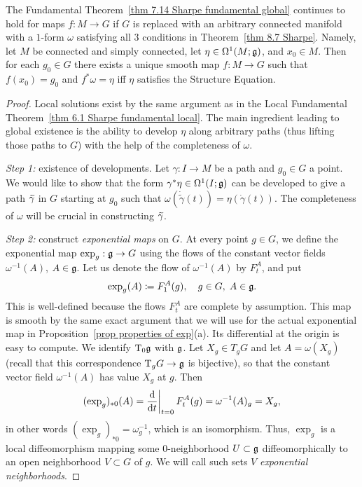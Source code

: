 \begin{thm}\label{prop generalization of fundamental thm}
    The Fundamental Theorem~\ref{thm 7.14 Sharpe fundamental global} continues to hold for maps $f:M\to G$ if $G$ is replaced with an arbitrary connected manifold with a $1$-form $\omega$ satisfying all $3$ conditions in Theorem~\ref{thm 8.7 Sharpe}. Namely, let $M$ be connected and simply connected, let $\eta\in\Omega^1(M;\mathfrak{g})$, and $x_0\in M$. Then for each $g_0\in G$ there exists a unique smooth map $f:M\to G$ such that $f(x_0)=g_0$ and $f^\ast\omega=\eta$ iff $\eta$ satisfies the Structure Equation.
\end{thm}
\begin{proof}
    Local solutions exist by the same argument as in the Local Fundamental Theorem~\ref{thm 6.1 Sharpe fundamental local}. The main ingredient leading to global existence is the ability to develop $\eta$ along arbitrary paths (thus lifting those paths to $G$) with the help of the completeness of $\omega$.

    \emph{Step 1:} existence of developments. Let $\gamma:I\to M$ be a path and $g_0\in G$ a point. We would like to show that the form $\gamma^\ast \eta\in \Omega^1(I;\mathfrak{g})$ can be developed to give a path $\wt\gamma$ in $G$ starting at $g_0$ such that $\omega(\dot{\tilde\gamma}(t))=\eta(\dot\gamma(t))$. The completeness of $\omega$ will be crucial in constructing $\wt\gamma$.

    \emph{Step 2:} construct \emph{exponential maps} on $G$. At every point $g\in G$, we define the exponential map $\exp_g:\mathfrak{g}\to G$ using the flows of the constant vector fields $\omega^{-1}(A)$, $A\in\mathfrak{g}$. Let us denote the flow of $\omega^{-1}(A)$ by $F^A_t$, and put 
    \[\exp_g(A)\coloneqq F^A_1(g),\quad g\in G,\;A\in\mathfrak{g}.\]
    This is well-defined because the flows $F^A_t$ are complete by assumption. This map is smooth by the same exact argument that we will use for the actual exponential map in Proposition~\ref{prop properties of exp}(a). Its differential at the origin is easy to compute. We identify $\mathrm{T}_0\mathfrak{g}$ with $\mathfrak{g}$. Let $X_g\in T_g G$ and let $A=\omega(X_g)$ (recall that this correspondence $\mathrm{T}_g G\to \mathfrak{g}$ is bijective), so that the constant vector field $\omega^{-1}(A)$ has value $X_g$ at $g$. Then 
    \[(\exp_g)_{\ast 0}(A)=\restr{\frac{\dd}{\dd t}}{t=0}F^A_t(g)=\omega^{-1}(A)_g=X_g,\]
    in other words $(\exp_g)_{\ast 0}=\omega^{-1}_g$, which is an isomorphism. Thus, $\exp_g$ is a local diffeomorphism mapping some $0$-neighborhood $U\subset \mathfrak{g}$ diffeomorphically to an open neighborhood $V\subset G$ of $g$. We will call such sets $V$ \emph{exponential neighborhoods}.


\end{proof}
